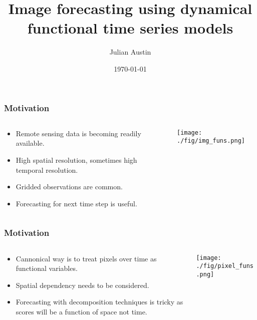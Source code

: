 \documentclass[aspectratio=169]{beamer}
\title{Image forecasting using dynamical functional time series models}
\date{\today}
\author{Julian Austin}
\institute{Newcastle University}
\begin{document}
  \maketitle
  \begin{frame}
    \frametitle{Motivation}
    \begin{columns}
      \begin{column}{0.5\textwidth}
        \begin{itemize}
          \item Remote sensing data is becoming readily available.
          \item High spatial resolution, sometimes high temporal resolution.
          \item Gridded observations are common.
          \item Forecasting for next time step is useful.
        \end{itemize}
      \end{column}
      \begin{column}{0.5\textwidth}
        \begin{center}
          \texttt{[image: ./fig/img\_funs.png]}
        \end{center}
      \end{column}
    \end{columns}
  \end{frame}

  \begin{frame}
    \frametitle{Motivation}
    \begin{columns}
      \begin{column}{0.5\textwidth}
        \begin{itemize}
          \item Cannonical way is to treat pixels over time as functional variables.
          \item Spatial dependency needs to be considered. 
          \item Forecasting with decomposition techniques is tricky as scores will be a function of space not time.
        \end{itemize}
      \end{column}
      \begin{column}{0.5\textwidth}
        \begin{center}
          \texttt{[image: ./fig/pixel\_funs.png]}
        \end{center}
      \end{column}
    \end{columns}
  \end{frame}
\end{document}
